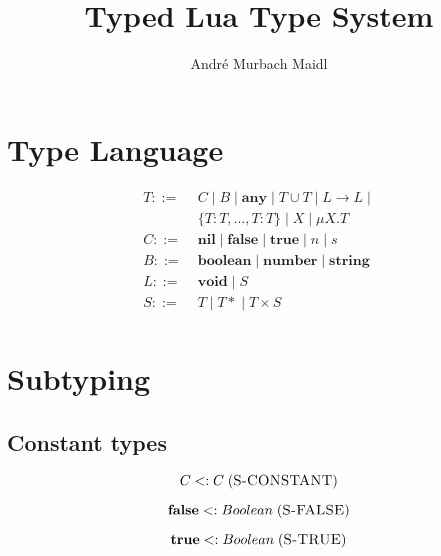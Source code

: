 \documentclass[12pt]{article}
\title{Typed Lua Type System}
\author{André Murbach Maidl}
\newcommand{\mylabel}[1]{\; (\textsc{#1})}
\newcommand{\subtype}{<:}
\newcommand{\pipe}{|\;}
\begin{document}
\maketitle

\section{Type Language}


\begin{align*}
T ::= \; & C \; \pipe B \; \pipe \mathbf{any} \; \pipe
T \cup T \; \pipe L \rightarrow L \; \pipe \\
& \{T:T, ..., T:T\} \; \pipe X \; \pipe \mu X.T\\
C ::= \; & \mathbf{nil} \; \pipe \mathbf{false} \; \pipe \mathbf{true} \;
\pipe n \; \pipe s\\
B ::= \; & \mathbf{boolean} \; \pipe \mathbf{number} \; \pipe \mathbf{string}\\
L ::= \; & \mathbf{void} \; \pipe S\\
S ::= \; & T \; \pipe {T*} \; \pipe T \times S\\ 
\end{align*}

\section{Subtyping}

\subsection{Constant types}

\[
C \subtype C
\mylabel{S-CONSTANT}
\]

\[
\mathbf{false} \subtype Boolean
\mylabel{S-FALSE}
\]

\[
\mathbf{true} \subtype Boolean
\mylabel{S-TRUE}
\]
\end{document}
